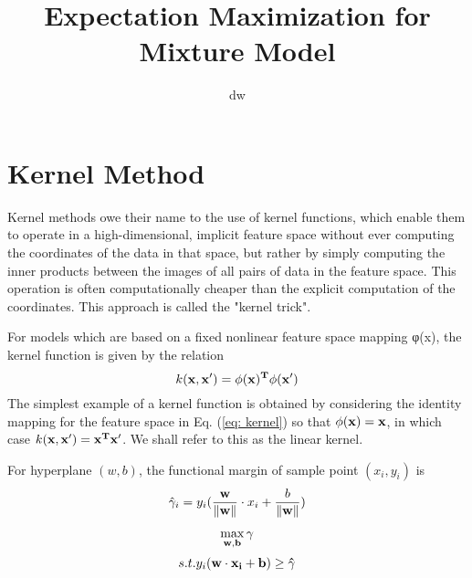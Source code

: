 \documentclass{article}
\title{Expectation Maximization for Mixture Model}
\author{dw}
\begin{document}
\maketitle
\section{Kernel Method}
Kernel methods owe their name to the use of kernel functions, which enable them to operate in a high-dimensional, implicit feature space without ever computing the coordinates of the data in that space, but rather by simply computing the inner products between the images of all pairs of data in the feature space. This operation is often computationally cheaper than the explicit computation of the coordinates. This approach is called the "kernel trick".

For models which are based on a fixed nonlinear feature space mapping φ(x), the kernel function is given
by the relation
\begin{equation}
	k(\bf{x},\bf{x}') = \phi(\bf{x})^T \phi(\bf{x}')
	\label{eq: kernel}
\end{equation}
The simplest example of a kernel function is obtained by considering the identity
mapping for the feature space in Eq. (\ref{eq: kernel}) so that $\phi(\bf{x}) = \bf{x}$, in which case $k(\bf{x}, \bf{x}') = \bf{x}^T \bf{x}'$. We shall refer to this as the linear kernel.

For hyperplane $(w,b)$, the functional margin of sample point $(x_i, y_i)$ is
\begin{equation}
	\hat{\gamma}_i = y_i (\frac{\bf{w}}{\lVert{\bf{w}}\rVert}\cdot x_i + \frac{b}{\lVert{\bf{w}}\rVert})
\end{equation}

\begin{equation}
	\max_{\bf{w},b} \gamma
\end{equation}
\begin{equation}
	s.t. y_i (\bf{w}\cdot x_i + b) \geq \hat{\gamma}
\end{equation}
\end{document}
